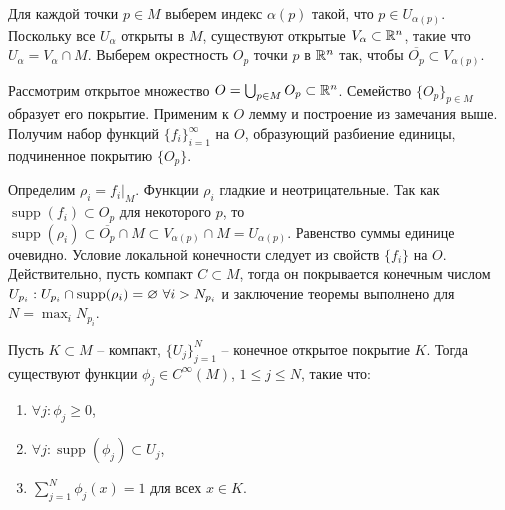 \begin{myproof}
	Для каждой точки $p \in M$ выберем индекс $\alpha(p)$ такой, что $p \in U_{\alpha(p)}$. Поскольку все $U_{\alpha}$ открыты в $M$, существуют открытые $V_{\alpha} \subset \mathbb{R}^n$, такие что $U_{\alpha} = V_{\alpha} \cap M$. Выберем окрестность $O_p$ точки $p$ в $\mathbb{R}^n$ так, чтобы $\overline{O_p} \subset V_{\alpha(p)}$. 
	
	\vspace{5pt}
	Рассмотрим открытое множество $O = \bigcup_{p \in M} O_p \subset \mathbb{R}^n$. Семейство $\{O_p\}_{p \in M}$ образует его покрытие. Применим к $O$ лемму и построение из замечания выше. Получим набор функций $\{f_i\}_{i=1}^\infty$ на $O$, образующий разбиение единицы, подчиненное покрытию $\{O_p\}$.
	
	\vspace{5pt}
	Определим $\rho_i = f_i|_M$. Функции $\rho_i$ гладкие и неотрицательные. Так как $\operatorname{supp}(f_i) \subset O_p$ для некоторого $p$, то
	$\operatorname{supp}(\rho_i) \subset \overline{O_p} \cap M \subset V_{\alpha(p)} \cap M = U_{\alpha(p)}$. 
	Равенство суммы единице очевидно. Условие локальной конечности следует из свойств $\{f_i\}$ на $O$. 
	Действительно, пусть компакт $C \subset M$, тогда он покрывается конечным числом $U_{p_i} : U_{p_i} \cap \operatorname{supp}(\rho_i) = \varnothing \ \forall i > N_{p_i}$ и заключение теоремы выполнено для $N = \max_i N_{p_i}$.
\end{myproof}


\begin{corollary}
	Пусть $K \subset M$ -- компакт, $\{U_j\}_{j=1}^{N}$ -- конечное открытое покрытие $K$. Тогда существуют функции $\phi_j \in C^{\infty}(M)$, $1 \leq j \leq N$, такие что:
	\begin{enumerate}[itemsep = 0pt, topsep = 5pt]
		\item $\forall j : \phi_j \geq 0$,
		\item $\forall j : \operatorname{supp} (\phi_j) \subset U_j$,
		\item $\sum_{j=1}^N \phi_j(x) = 1$ для всех $x \in K$. 
	\end{enumerate}
\end{corollary}

